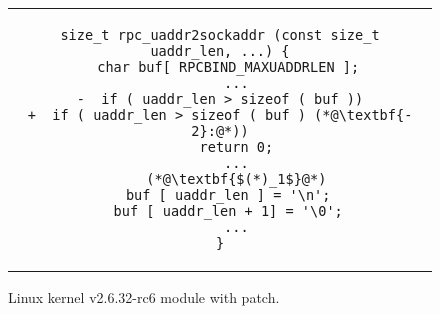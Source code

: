 \begin{figure}[H]
\centering
\begin{tabular}{c}
\begin{lstlisting}
size_t rpc_uaddr2sockaddr (const size_t uaddr_len, ...) {
  char buf[ RPCBIND_MAXUADDRLEN ];
    ...
-  if ( uaddr_len > sizeof ( buf ))
+  if ( uaddr_len > sizeof ( buf ) (*@\textbf{- 2}:@*))
    return 0;
    ...
    (*@\textbf{$(*)_1$}@*)
  buf [ uaddr_len ] = '\n';
  buf [ uaddr_len + 1] = '\0';
    ...
}
\end{lstlisting}
\end{tabular}
\caption{Linux kernel  v2.6.32-rc6 module with patch.}
\end{figure} 